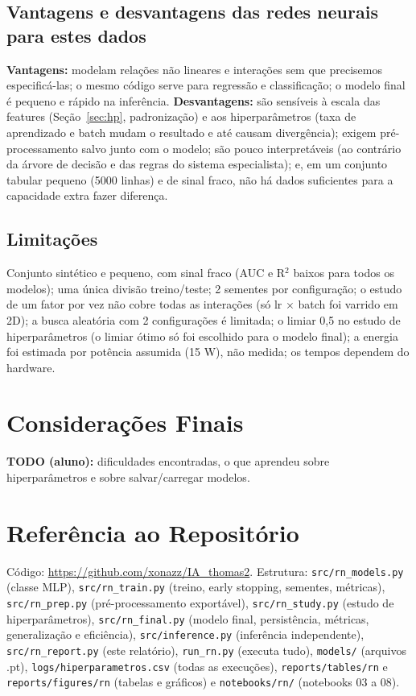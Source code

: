 \documentclass[11pt,a4paper]{article}
\begin{document}
\subsection{Vantagens e desvantagens das redes neurais para estes dados}
\textbf{Vantagens:} modelam relações não lineares e interações sem que precisemos especificá-las; o mesmo código serve para
regressão e classificação; o modelo final é pequeno e rápido na inferência. \textbf{Desvantagens:} são sensíveis à escala das
features (Seção~\ref{sec:hp}, padronização) e aos hiperparâmetros (taxa de aprendizado e batch mudam o resultado e até causam
divergência); exigem pré-processamento salvo junto com o modelo; são pouco interpretáveis (ao contrário da árvore de decisão e das regras
do sistema especialista); e, em um conjunto tabular pequeno (5000 linhas) e de sinal fraco, não há dados suficientes para a capacidade
extra fazer diferença.

\subsection{Limitações}
Conjunto sintético e pequeno, com sinal fraco (AUC e R$^2$ baixos para todos os modelos); uma única divisão treino/teste; 2
sementes por configuração; o estudo de um fator por vez não cobre todas as interações (só lr $\times$ batch foi varrido em 2D); a busca
aleatória com 2 configurações é limitada; o limiar 0,5 no estudo de hiperparâmetros (o limiar ótimo só foi escolhido para o
modelo final); a energia foi estimada por potência assumida (15 W), não medida; os tempos dependem do hardware.

\section{Considerações Finais}
\textbf{TODO (aluno):} dificuldades encontradas, o que aprendeu sobre hiperparâmetros e sobre salvar/carregar modelos.

\section{Referência ao Repositório}
Código: \url{https://github.com/xonazz/IA_thomas2}. Estrutura: \texttt{src/rn\_models.py} (classe MLP), \texttt{src/rn\_train.py}
(treino, early stopping, sementes, métricas), \texttt{src/rn\_prep.py} (pré-processamento exportável), \texttt{src/rn\_study.py}
(estudo de hiperparâmetros), \texttt{src/rn\_final.py} (modelo final, persistência, métricas, generalização e eficiência),
\texttt{src/inference.py} (inferência independente), \texttt{src/rn\_report.py} (este relatório), \texttt{run\_rn.py} (executa tudo),
\texttt{models/} (arquivos .pt), \texttt{logs/hiperparametros.csv} (todas as execuções), \texttt{reports/tables/rn} e
\texttt{reports/figures/rn} (tabelas e gráficos) e \texttt{notebooks/rn/} (notebooks 03 a 08).
\end{document}
